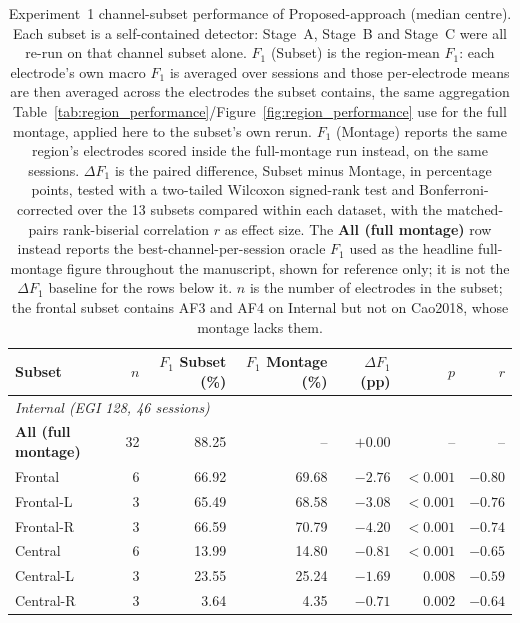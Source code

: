 \begin{table}[htbp]
\centering
\footnotesize
\setlength{\tabcolsep}{4pt}
\caption{Experiment~1 channel-subset performance of Proposed-approach (median centre). Each subset is a self-contained detector: Stage~A, Stage~B and Stage~C were all re-run on that channel subset alone. $F_1$ (Subset) is the region-mean $F_1$: each electrode's own macro $F_1$ is averaged over sessions and those per-electrode means are then averaged across the electrodes the subset contains, the same aggregation Table~\ref{tab:region_performance}/Figure~\ref{fig:region_performance} use for the full montage, applied here to the subset's own rerun. $F_1$ (Montage) reports the same region's electrodes scored inside the full-montage run instead, on the same sessions. $\Delta F_1$ is the paired difference, Subset minus Montage, in percentage points, tested with a two-tailed Wilcoxon signed-rank test and Bonferroni-corrected over the 13 subsets compared within each dataset, with the matched-pairs rank-biserial correlation $r$ as effect size. The \textbf{All (full montage)} row instead reports the best-channel-per-session oracle $F_1$ used as the headline full-montage figure throughout the manuscript, shown for reference only; it is not the $\Delta F_1$ baseline for the rows below it. $n$ is the number of electrodes in the subset; the frontal subset contains AF3 and AF4 on Internal but not on Cao2018, whose montage lacks them.}
\label{tab:exp1_subset_summary}
\begin{tabular}{lrrrrrr}
\toprule
Subset & $n$ & $F_1$ Subset (\%) & $F_1$ Montage (\%) & $\Delta F_1$ (pp) & $p$ & $r$ \\
\midrule
\multicolumn{7}{l}{\textit{Internal (EGI 128, 46 sessions)}} \\[2pt]
\textbf{All (full montage)} & 32 & 88.25 & -- & $+0.00$ & -- & -- \\
Frontal & 6 & 66.92 & 69.68 & $-2.76$ & $<0.001$ & $-0.80$ \\
Frontal-L & 3 & 65.49 & 68.58 & $-3.08$ & $<0.001$ & $-0.76$ \\
Frontal-R & 3 & 66.59 & 70.79 & $-4.20$ & $<0.001$ & $-0.74$ \\
Central & 6 & 13.99 & 14.80 & $-0.81$ & $<0.001$ & $-0.65$ \\
Central-L & 3 & 23.55 & 25.24 & $-1.69$ & $0.008$ & $-0.59$ \\
Central-R & 3 & 3.64 & 4.35 & $-0.71$ & $0.002$ & $-0.64$ \\

\end{tabular}
\end{table}
